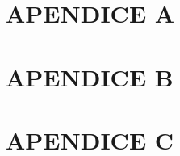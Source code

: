 \chapter{APENDICE A}
\label{appendix:apendiceA}



\chapter{APENDICE B}
\label{appendix:apendiceB}



\chapter{APENDICE C}
\label{appendix:apendiceC}
